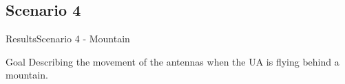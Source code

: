 \subsection{Scenario 4}

\begin{frame}{Results}{Scenario 4 - Mountain}

  \begin{block}{Goal}
	Describing the movement of the antennas when the UA is flying behind a mountain.
  \end{block}

  \begin{figure}[H]
    \centerline{
    \hfill
    }
  \end{figure}

\end{frame}



